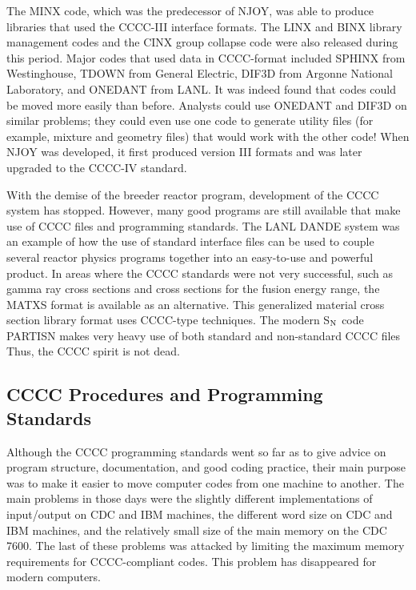 The MINX code\cite{MINX}, which was the predecessor of NJOY,
was able to produce libraries \cite{LIBIV} that used
the CCCC-III interface formats.  The LINX and
BINX library management codes\cite{LINXBINX} and the
CINX group collapse code\cite{CINX} were also released
during this period.  Major codes that used data in CCCC-format
included SPHINX\cite{SPHINX} from
Westinghouse, TDOWN\cite{TDOWN}
from General Electric,
DIF3D\cite{DIF3D} from Argonne National Laboratory,
 and ONEDANT\cite{ONEDANT}
from LANL.  It was indeed found that
codes could be moved more easily than before.  Analysts could use
ONEDANT and DIF3D on similar problems; they could even use one code to
generate utility files (for example, mixture and geometry files) that
would work with the other code!  When NJOY was developed, it first
produced version III formats and was later upgraded to the CCCC-IV
standard.

With the demise of the breeder reactor program, development of the CCCC
system has stopped.  However, many good programs are still available
that make use of CCCC files and programming standards.  The LANL
DANDE system\cite{DANDE} was an example of how the use of standard
interface files can be used to couple several reactor physics programs
together into an easy-to-use and powerful product.  In areas where the
CCCC standards were not very successful, such as gamma ray cross
sections and cross sections for the fusion energy range,
the MATXS format is available as an alternative.  This generalized
material cross section library format uses CCCC-type techniques.
The modern S$_{\rm N}$ code PARTISN\cite{PARTISN} makes very heavy
use of both standard and non-standard CCCC files  Thus, the CCCC
spirit is not dead.

\subsection{CCCC Procedures and Programming Standards}
\label{ssCCCCR_Proc}

Although the CCCC programming standards went so far as to give advice on
program structure, documentation, and good coding practice, their main
purpose was to make it easier to move computer codes from one machine
to another.  The main problems in those days were the slightly different
implementations of input/output on CDC and IBM machines, the different
word size on CDC and IBM machines, and the relatively small size of the
main memory on the CDC 7600.  The last of these problems was attacked by
limiting the maximum memory requirements for CCCC-compliant codes.  This
problem has disappeared for modern computers.

